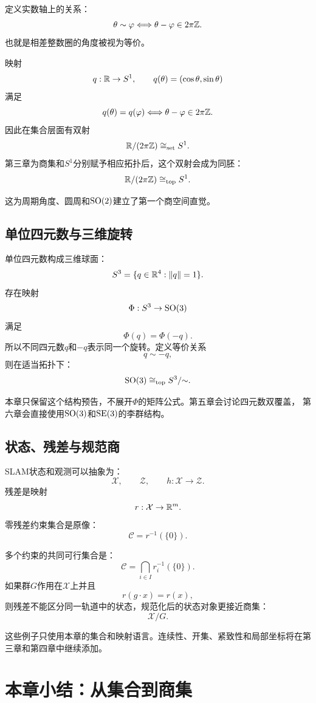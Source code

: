 定义实数轴上的关系：
\[
    \theta\sim\varphi
    \Longleftrightarrow
    \theta-\varphi\in2\pi\mathbb{Z}.
\]
也就是相差整数圈的角度被视为等价。

映射
\[
    q:\mathbb{R}\to S^1,
    \qquad
    q(\theta)=(\cos\theta,\sin\theta)
\]
满足
\[
    q(\theta)=q(\varphi)
    \Longleftrightarrow
    \theta-\varphi\in2\pi\mathbb{Z}.
\]
因此在集合层面有双射
\[
    \mathbb{R}/(2\pi\mathbb{Z})\cong_{\mathrm{set}}S^1.
\]
第三章为商集和$S^1$分别赋予相应拓扑后，这个双射会成为同胚：
\[
    \mathbb{R}/(2\pi\mathbb{Z})\cong_{\mathrm{top}}S^1.
\]

这为周期角度、圆周和$\operatorname{SO}(2)$建立了第一个商空间直觉。

\subsection{单位四元数与三维旋转}

单位四元数构成三维球面：
\[
    S^3
    =
    \{q\in\mathbb{R}^4:\|q\|=1\}.
\]
存在映射
\[
    \Phi:S^3\to\operatorname{SO}(3)
\]
满足
\[
    \Phi(q)=\Phi(-q).
\]
所以不同四元数$q$和$-q$表示同一个旋转。定义等价关系
\[
    q\sim -q,
\]
则在适当拓扑下：
\[
    \operatorname{SO}(3)
    \cong_{\mathrm{top}}
    S^3/{\sim}.
\]

本章只保留这个结构预告，不展开$\Phi$的矩阵公式。第五章会讨论四元数双覆盖， 第六章会直接使用$\operatorname{SO}(3)$和$\operatorname{SE}(3)$的李群结构。

\subsection{状态、残差与规范商}

SLAM状态和观测可以抽象为：
\[
    \mathcal X,\qquad
    \mathcal Z,\qquad
    h:\mathcal X\to\mathcal Z.
\]
残差是映射
\[
    r:\mathcal X\to\mathbb{R}^m.
\]
零残差约束集合是原像：
\[
    \mathcal C
    =
    r^{-1}(\{0\}).
\]

多个约束的共同可行集合是：
\[
    \mathcal C
    =
    \bigcap_{i\in I}r_i^{-1}(\{0\}).
\]
如果群$G$作用在$\mathcal X$上并且
\[
    r(g\cdot x)=r(x),
\]
则残差不能区分同一轨道中的状态，规范化后的状态对象更接近商集：
\[
    \mathcal X/G.
\]

这些例子只使用本章的集合和映射语言。连续性、开集、紧致性和局部坐标将在第三章和第四章中继续添加。


\section{本章小结：从集合到商集}

